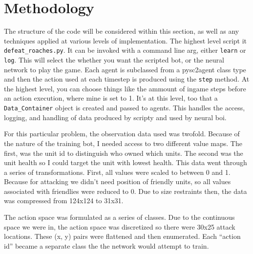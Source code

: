 \documentclass{amsart}
\newcounter{temp}
\theoremstyle{definition}
\begin{document}

\section{Methodology}


The structure of the code will be considered within this section, as well as any techniques applied at various levels of implementation.
The highest level script it {\tt defeat\_roaches.py}.
It can be invoked with a command line arg, either {\tt learn} or {\tt log}.
This will select the whether you want the scripted bot, or the neural network to play the game.
Each agent is subclassed from a pysc2agent class type and then the action used at each timestep is produced using the {\tt step} method.
At the highest level, you can choose things like the ammount of ingame steps before an action execution, where mine is set to 1.
It's at this level, too that a {\tt Data\_Container} object is created and passed to agents.
This handles the access, logging, and handling of data produced by scripty and used by neural boi.

For this particular problem, the observation data used was twofold.
Because of the nature of the training bot, I needed access to two different value maps.
The first, was the unit id to distinguish who owned which units.
The second was the unit health so I could target the unit with lowest health.
This data went through a series of transformations.
First, all values were scaled to between 0 and 1.
Because for attacking we didn't need position of friendly units, so all values associated with friendlies were reduced to 0.
Due to size restraints then, the data was compressed from 124x124 to 31x31.

The action space was formulated as a series of classes.
Due to the continuous space we were in, the action space was discretized so there were 30x25 attack locations.
These (x, y) pairs were flattened and then enumerated.
Each ``action id'' became a separate class the the network would attempt to train.
\end{document}
